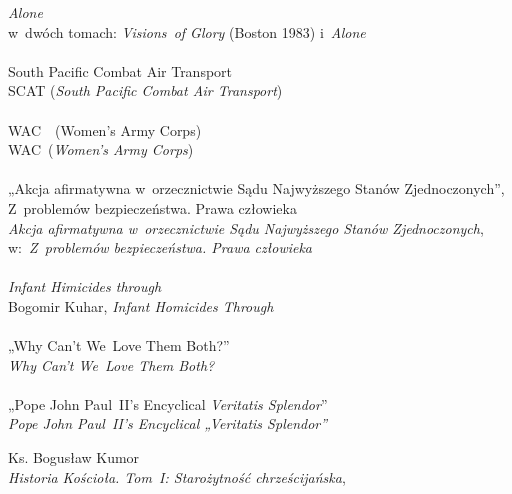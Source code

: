 \documentclass[a4paper,11pt]{article}
\begin{document}
\textit{Alone} \\
\Powin w~dwóch tomach: \textit{Visions~of Glory} (Boston 1983)
i~\textit{Alone} \\
 \\
\Jest  South Pacific Combat Air Transport \\
\Powin SCAT (\textit{South Pacific Combat Air Transport}) \\
 \\
\Jest  WAC~~(Women's Army Corps) \\
\Powin WAC~(\textit{Women's Army Corps}) \\
 \\
\Jest „Akcja afirmatywna w~orzecznictwie Sądu Najwyższego Stanów
Zjednoczonych”, Z~problemów bezpieczeństwa. Prawa człowieka \\
\Powin \textit{Akcja afirmatywna w~orzecznictwie Sądu Najwyższego Stanów
  Zjednoczonych}, w:~\textit{Z~problemów bezpieczeństwa. Prawa człowieka} \\
 \\
\Jest \textit{Infant Himicides through} \\
\Powin Bogomir Kuhar, \textit{Infant Homicides Through} \\
 \\
\Jest  „Why Can't We~Love Them Both?” \\
\Powin \textit{Why Can't We~Love Them Both?} \\
 \\
\Jest  „Pope John Paul~II's Encyclical \textit{Veritatis Splendor}” \\
\Powin \textit{Pope John Paul~II's Encyclical „Veritatis Splendor”} \\













\newpage

{ %
  Ks. Bogusław Kumor \\
  \textit{Historia Kościoła. Tom~I: Starożytność chrześcijańska},
  \cite{KumorHistoriaKosciolaVolI2003}}


\end{document}

